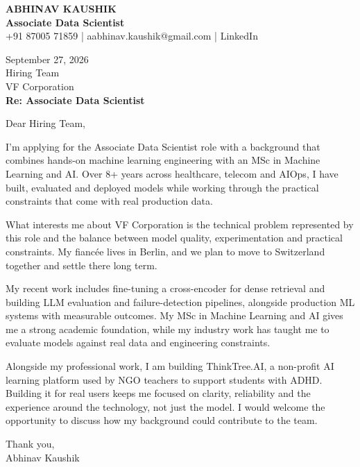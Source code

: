 \documentclass[10pt,a4paper]{article}
\begin{document}
\begin{center}
{\Large\bfseries ABHINAV KAUSHIK}\\[2pt]
{\bfseries Associate Data Scientist}\\[2pt]
+91 87005 71859 \quad | \quad aabhinav.kaushik@gmail.com \quad | \quad LinkedIn
\end{center}
\vspace{8pt}
September 27, 2026\\[6pt]
Hiring Team\\
VF Corporation\\[4pt]
\textbf{Re: Associate Data Scientist}

Dear Hiring Team,

I’m applying for the Associate Data Scientist role with a background that combines hands-on machine learning engineering with an MSc in Machine Learning and AI. Over 8+ years across healthcare, telecom and AIOps, I have built, evaluated and deployed models while working through the practical constraints that come with real production data.

What interests me about VF Corporation is the technical problem represented by this role and the balance between model quality, experimentation and practical constraints. My fiancée lives in Berlin, and we plan to move to Switzerland together and settle there long term.

My recent work includes fine-tuning a cross-encoder for dense retrieval and building LLM evaluation and failure-detection pipelines, alongside production ML systems with measurable outcomes. My MSc in Machine Learning and AI gives me a strong academic foundation, while my industry work has taught me to evaluate models against real data and engineering constraints.

Alongside my professional work, I am building ThinkTree.AI, a non-profit AI learning platform used by NGO teachers to support students with ADHD. Building it for real users keeps me focused on clarity, reliability and the experience around the technology, not just the model. I would welcome the opportunity to discuss how my background could contribute to the team.

Thank you,\\
Abhinav Kaushik
\end{document}
